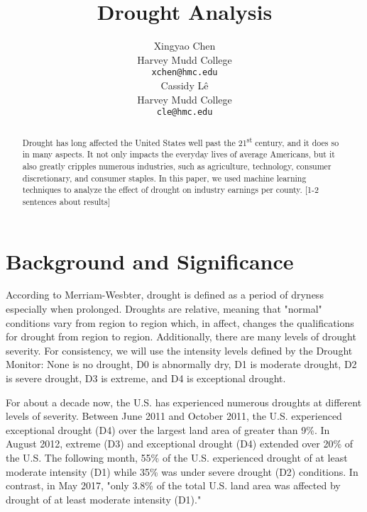 \documentclass{article}
\title{Drought Analysis}
\author{%
  Xingyao Chen\\
  Harvey Mudd College\\
  \texttt{xchen@hmc.edu} \\
  \And
  Cassidy L\^e\\
  Harvey Mudd College\\
  \texttt{cle@hmc.edu} \\
}
\begin{document}
\maketitle

\begin{abstract}
  Drought has long affected the United States well past the 21\textsuperscript{st} century, and it does so in many aspects. It not only impacts the everyday lives of average Americans, but it also greatly cripples numerous industries, such as agriculture, technology, consumer discretionary, and consumer staples. In this paper, we used machine learning techniques to analyze the effect of drought on industry earnings per county. [1-2 sentences about results]
\end{abstract}

\section{Background and Significance}
According to Merriam-Wesbter, drought is defined as a period of dryness especially when prolonged. Droughts are relative, meaning that "normal" conditions vary from region to region which, in affect, changes the qualifications for drought from region to region. Additionally, there are many levels of drought severity. For consistency, we will use the intensity levels defined by the Drought Monitor: None is no drought, D0 is abnormally dry, D1 is moderate drought, D2 is severe drought, D3 is extreme, and D4 is exceptional drought.

For about a decade now, the U.S. has experienced numerous droughts at different levels of severity. Between June 2011 and October 2011, the U.S. experienced exceptional drought (D4) over the largest land area of greater than 9\%. In August 2012, extreme (D3) and exceptional drought (D4) extended over 20\% of the U.S. The following month, 55\% of the U.S. experienced drought of at least moderate intensity (D1) while 35\% was under severe drought (D2) conditions. In contrast, in May 2017, "only 3.8\% of the total U.S. land area was affected by drought of at least moderate intensity (D1)." \cite{Folger:2017jd}
\end{document}

